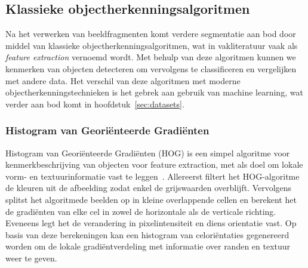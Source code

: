 \subsection{Klassieke objectherkenningsalgoritmen}
\label{subsec:klassieke-objectherkenningsalgoritmen}
Na het verwerken van beeldfragmenten komt verdere segmentatie aan bod door middel van klassieke objectherkenningsalgoritmen, wat in vakliteratuur vaak als \textit{feature extraction} vernoemd wordt.
Met behulp van deze algoritmen kunnen we kenmerken van objecten detecteren om vervolgens te classificeren en vergelijken met andere data.
Het verschil van deze algoritmen met moderne objectherkenningstechnieken is het gebrek aan gebruik van machine learning, wat verder aan bod komt in hoofdstuk~\ref{sec:datasets}.

\subsubsection{Histogram van Georiënteerde Gradiënten}
Histogram van Geori\"enteerde Gradi\"enten (HOG) is een simpel algoritme voor kenmerkbeschrijving van objecten voor feature extraction, met als doel om lokale vorm- en textuurinformatie vast te leggen~\autocite{Saher2023}.
Allereerst filtert het HOG-algoritme de kleuren uit de afbeelding zodat enkel de grijswaarden overblijft.
Vervolgens splitst het algoritmede beelden op in kleine overlappende cellen en berekent het de gradi\"enten van elke cel in zowel de horizontale als de verticale richting.
Eveneens legt het de verandering in pixelintensiteit en diens orientatie vast.
Op basis van deze berekeningen kan een histogram van celori\"entaties gegenereerd worden om de lokale gradi\"entverdeling met informatie over randen en textuur weer te geven.

